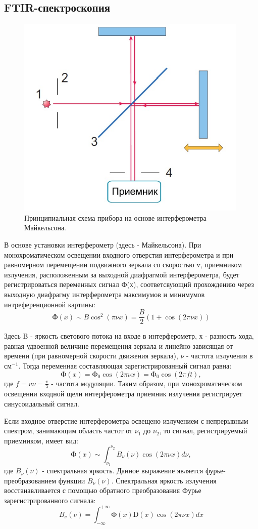 \documentclass{article}
\begin{document}
\subsection{FTIR-спектроскопия}\;
\begin{figure}[h!]
    \centering
    \includegraphics[width=0.5\linewidth]{scheme.png}
    \caption{Принципиальная схема прибора на основе интерферометра Майкельсона.}
    \label{прицип установки}
\end{figure}
\par В основе установки интерферометр (здесь - Майкельсона). При монохроматическом освещении входного отверстия интерферометра и при равномерном перемещении подвижного зеркала со скоростью v, приемником излучения, расположенным за выходной диафрагмой интерферометра, будет регистрироваться переменных сигнал Ф(х), соответсвующий прохождению через выходную диафрагму интерферометра максимумов и минимумов интреференционной картины:
\[\text{Ф}(x) \sim B\cos^2{(\pi \nu x)} = \frac{B}{2}(1+\cos{(2\pi \nu x)})\]
\par Здесь B - яркость светового потока на входе в интерферометр, х - разность хода, равная удвоенной величине перемещения зеркала и линейно зависящая от времени (при равномерной скорости движения зеркала), $\nu$ - частота излучения в $\text{см}^{-1}$. Тогда переменная составляющая зарегистрированный сигнал равна:
\[\text{Ф}(x) = \text{Ф}_0 \cos{(2\pi \nu x)} = \text{Ф}_0\cos{(2\pi ft)},\]
где $f = v\nu = \frac{v}{\lambda}$ - частота модуляции. Таким образом, при монохроматическом освещении входной щели интерферометра приемник излучения регистрирует синусоидальный сигнал.\par
Если входное отверстие интерферометра освещено излучением с непрерывным спектром, занимающим область частот от $\nu_1$ до $\nu_2$, то сигнал, регистрируемый приемником, имеет вид:
\[\text{Ф}(x) \sim \int_{\nu_1}^{\nu_2} B_{\nu}(\nu)\cos{(2\pi \nu x)d\nu},\]
где $B_{\nu}(\nu)$ - спектральная яркость. Данное выражение является фурье-преобразованием функции $B_{\nu}(\nu)$. Спектральная яркость излучения восстанавливается с помощью обратного преобразования Фурье зарегистрированного сигнала:
\[B_{\nu}(\nu) = \int_{-\infty}^{+\infty} \text{Ф}(x) \text{D}(x)\cos{(2\pi \nu x)} dx\]
\end{document}

